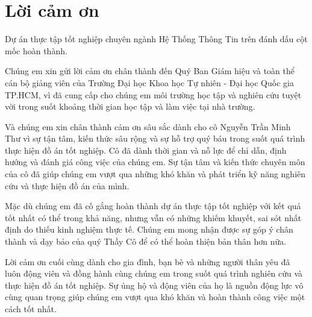 \chapter*{Lời cảm ơn}
\label{thanks}

Dự án thực tập tốt nghiệp chuyên ngành Hệ Thống Thông Tin trên đánh dấu cột
mốc hoàn thành.

Chúng em xin gửi lời cảm ơn chân thành đến Quý Ban Giám hiệu và toàn thể cán
bộ giảng viên của Trường Đại học Khoa học Tự nhiên - Đại học Quốc gia TP.HCM, vì đã cung cấp cho chúng em môi trường học tập và nghiên cứu tuyệt vời trong suốt khoảng thời gian học tập và làm việc tại nhà trường.

Và chúng em xin chân thành cảm ơn sâu sắc dành cho cô Nguyễn Trần Minh Thư vì sự tận tâm, kiến thức sâu rộng và sự hỗ trợ quý báu trong suốt quá trình thực hiện đồ án tốt nghiệp. Cô đã dành thời gian và nỗ lực để chỉ dẫn, định hướng và đánh giá công việc của chúng em. Sự tận tâm và kiến thức chuyên môn của cô đã giúp chúng em vượt qua những khó khăn và phát triển kỹ năng nghiên cứu và thực hiện đồ án của mình.

Mặc dù chúng em đã cố gắng hoàn thành dự án thực tập tốt nghiệp với kết quả tốt nhất có thể trong khả năng, nhưng vẫn có những khiếm khuyết, sai sót nhất định do thiếu kinh nghiệm thực tế. Chúng em mong nhận được sự góp ý chân thành và dạy bảo của quý Thầy Cô để có thể hoàn thiện bản thân hơn nữa.

Lời cảm ơn cuối cùng dành cho gia đình, bạn bè và những người thân yêu đã luôn động viên và đồng hành cùng chúng em trong suốt quá trình nghiên cứu và thực hiện đồ án tốt nghiệp. Sự ủng hộ và động viên của họ là nguồn động lực vô cùng quan trọng giúp chúng em vượt qua khó khăn và hoàn thành công việc một cách tốt nhất.